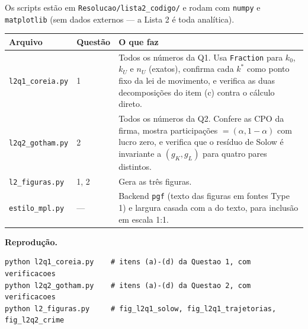 \documentclass[11pt, a4paper]{article}
\newcommand{\passo}[1]{\medskip\noindent\textbf{#1}\par\nobreak}
\newcommand{\stst}{^{\ast}}
\begin{document}
Os scripts estão em \texttt{Resolucao/lista2\_codigo/} e rodam com \texttt{numpy} e
\texttt{matplotlib} (sem dados externos --- a Lista 2 é toda analítica).

\begin{center}
\small
\begin{tabular}{llp{7.2cm}}
\toprule
\textbf{Arquivo} & \textbf{Questão} & \textbf{O que faz} \\
\midrule
\texttt{l2q1\_coreia.py}  & 1 & Todos os números da Q1. Usa \texttt{Fraction} para
  $k_0$, $k_U$ e $n_U$ (exatos), confirma cada $k\stst$ como ponto fixo da lei de
  movimento, e verifica as duas decomposições do item (c) contra o cálculo direto. \\
\texttt{l2q2\_gotham.py}  & 2 & Todos os números da Q2. Confere as CPO da firma, mostra
  participações $=(\alpha,1-\alpha)$ com lucro zero, e verifica que o resíduo de Solow é
  invariante a $(g_K,g_L)$ para quatro pares distintos. \\
\texttt{l2\_figuras.py}   & 1, 2 & Gera as três figuras. \\
\texttt{estilo\_mpl.py}   & --- & Backend \texttt{pgf} (texto das figuras em fontes
  Type 1) e largura casada com a do texto, para inclusão em escala 1:1. \\
\bottomrule
\end{tabular}
\end{center}

\passo{Reprodução.}

\begin{tcolorbox}[colback=gray!7, colframe=gray!50, arc=2pt, boxrule=0.4pt]
\footnotesize
\begin{verbatim}
python l2q1_coreia.py    # itens (a)-(d) da Questao 1, com verificacoes
python l2q2_gotham.py    # itens (a)-(d) da Questao 2, com verificacoes
python l2_figuras.py     # fig_l2q1_solow, fig_l2q1_trajetorias, fig_l2q2_crime
\end{verbatim}
\end{tcolorbox}
\end{document}
